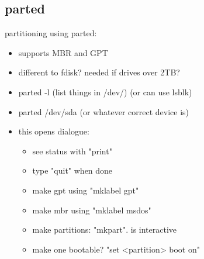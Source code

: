 \subsection{parted}

partitioning using parted:

\begin{itemize}
  \item supports MBR and GPT
  \item different to fdisk? needed if drives over 2TB?
  \item parted -l (list things in /dev/) (or can use lsblk)
  \item parted /dev/sda (or whatever correct device is)
  \item this opens dialogue:
  \begin{itemize}
    \item see status with "print"
    \item type "quit" when done
    \item make gpt using "mklabel gpt"
    \item make mbr using "mklabel msdos"
    \item make partitions: "mkpart". is interactive
    \item make one bootable? "set <partition> boot on"
  \end{itemize}
\end{itemize}
  


